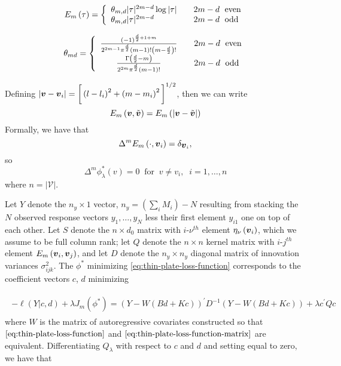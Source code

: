 \documentclass[12pt]{article}
\newcommand{\bfv}{\mbox{\boldmath $v$}}
\theoremstyle{definition}
\begin{document}
\begin{align} \label{eq:thin-plate-pseudo-kernel-1}
E_m\left( \tau \right) = \left \{ \begin{array}{ll}   \theta_{m,d} \vert \tau \vert^{2m-d}\log \vert \tau \vert  &  \quad 2m-d \mbox{\; even} \\
					   \theta_{m,d} \vert \tau \vert^{2m-d}& \quad 2m-d \mbox{\; odd} \end{array} \right.
\end{align}

\begin{align} \label{eq:thin-plate-pseudo-kernel-2}
\theta_{md} = \left \{ \begin{array}{cl}   \frac{ \left( -1 \right)^{\frac{d}{2} + 1 + m} }{ 2^{2m-1}\pi^{\frac{d}{2}}\left(m-1\right)! \left( m - \frac{d}{2} \right)! }   & \quad 2m-d \mbox{\; even} \\
					   \frac{ \Gamma\left( \frac{d}{2} - m\right) }{ 2^{2m}\pi^{\frac{d}{2}}\left(m-1\right)! }    & \quad 2m-d \mbox{\; odd} \end{array} \right.
\end{align}

Defining $\vert \bfv - \bfv_i \vert = \bigg[ \left( l - l_i \right)^2 + \left( m - m_i \right)^2  \bigg]^{1/2}$, then we can write 
\[
E_m\left( \bfv,\tilde{\bfv} \right) = E_m\left(\vert \bfv-\tilde{\bfv} \vert \right) 
\]
\noindent
Formally, we have that 
\[
\Delta^m E_m\left( \cdot,\bfv_i \right) = \delta_{\bfv_i}, 
\]
so 
\[
\Delta^m \phi^*_\lambda \left( v \right) = 0 \;\; \mbox{for}\;\;v \ne v_i, \;\;i=1,\dots, n 
\]
\noindent
where $n = \vert \mathcal{V} \vert$.

\bigskip

Let $Y$ denote the $n_y \times 1$ vector, $n_y=\left(\sum \limits_{i} M_i \right) - N$ resulting from stacking the $N$ observed response vectors $y_1,\dots, y_N$ less their first element $y_{i1}$ one on top of each other. Let $S$ denote the $n \times d_0$ matrix with $i$-$\nu^{th}$ element $\eta_\nu\left(\bfv_i\right)$, which we assume to be full column rank; let $Q$ denote the $n \times n$ kernel matrix with $i$-$j^{th}$ element $E_m\left(\bfv_i, \bfv_j\right)$, and let $D$ denote the $n_y \times n_y$ diagonal matrix of innovation variances $\sigma^2_{ijk}$. The $\phi^*$ minimizing \ref{eq:thin-plate-loss-function} corresponds to the coefficient vectors $c$, $d$ minimizing

\begin{align}
\begin{split} \label{eq:penalized-likelihood-vectorized} 
-\ell\left(Y \vert c,d\right) + \lambda J_m\left(\phi^*\right) = \left( Y - W \left( Bd + Kc \right) \right)^\prime D^{-1} \left( Y - W \left( Bd + Kc \right) \right) + \lambda c^\prime Q c 
\end{split}
\end{align} 
\bigskip
\noindent
 where $W$ is the matrix of autoregressive covariates constructed so that $\ref{eq:thin-plate-loss-function}$ and $\ref{eq:thin-plate-loss-function-matrix}$ are equivalent. 
\bigskip
Differentiating $Q_\lambda$ with respect to $c$ and $d$ and setting equal to zero, we have that 
\end{document}
